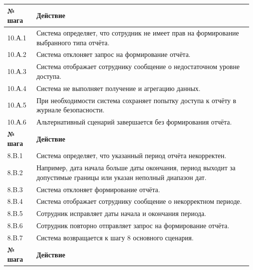 \documentclass[12pt,a4paper]{article}
\begin{document}
\begin{xltabular}{\textwidth}{
				|>{\raggedright\arraybackslash}p{2.7cm}
				|>{\raggedright\arraybackslash}X|
			}
			
			\textbf{№ шага} & \textbf{Действие} \\
			\hline
			
			10.А.1 & Система определяет, что сотрудник не имеет прав на формирование
			выбранного типа отчёта. \\
			\hline
			10.А.2 & Система отклоняет запрос на формирование отчёта. \\
			\hline
			10.А.3 & Система отображает сотруднику сообщение о недостаточном уровне
			доступа. \\
			\hline
			10.А.4 & Система не выполняет получение и агрегацию данных. \\
			\hline
			10.А.5 & При необходимости система сохраняет попытку доступа к отчёту в
			журнале безопасности. \\
			\hline
			10.А.6 & Альтернативный сценарий завершается без формирования отчёта. \\
			\hline
			
			
			\textbf{№ шага} & \textbf{Действие} \\
			\hline
			
			8.B.1 & Система определяет, что указанный период отчёта некорректен. \\
			\hline
			8.B.2 & Например, дата начала больше даты окончания, период выходит за
			допустимые границы или указан неполный диапазон дат. \\
			\hline
			8.B.3 & Система отклоняет формирование отчёта. \\
			\hline
			8.B.4 & Система отображает сотруднику сообщение о некорректном периоде. \\
			\hline
			8.B.5 & Сотрудник исправляет даты начала и окончания периода. \\
			\hline
			8.B.6 & Сотрудник повторно отправляет запрос на формирование отчёта. \\
			\hline
			8.B.7 & Система возвращается к шагу 8 основного сценария. \\
			\hline
			
			
			\textbf{№ шага} & \textbf{Действие} \\
			\hline
			

\end{xltabular}
\end{document}
